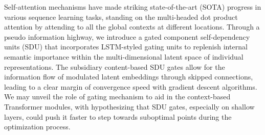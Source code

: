 Self-attention mechanisms have made striking state-of-the-art (SOTA) progress in various sequence learning tasks, standing on the multi-headed dot product attention by attending to all the global contexts at different locations. Through a pseudo information highway, we introduce a gated component self-dependency units (SDU) that incorporates LSTM-styled gating units to replenish internal semantic importance within the multi-dimensional latent space of individual representations. The subsidiary content-based SDU gates allow for the information flow of modulated latent embeddings through skipped connections, leading to a clear margin of convergence speed with gradient descent algorithms. We may unveil the role of gating mechanism to aid in the context-based Transformer modules, with hypothesizing that SDU gates, especially on shallow layers, could push it faster to step towards suboptimal points during the optimization process.
